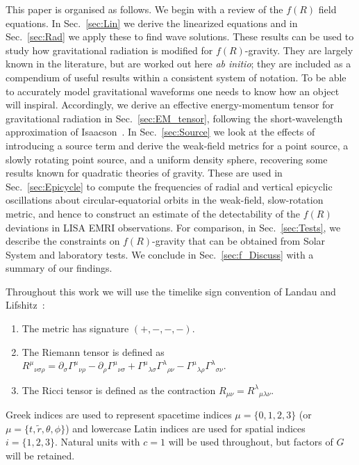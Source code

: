 \documentclass[aps,prd,amsfonts,amssymb,amsmath,nofootinbib,reprint,showpacs]{revtex4-1}
\newcommand{\secref}[1]{Sec.\ \ref{sec:#1}}
\begin{document}
This paper is organised as follows. We begin with a review of the $f(R)$ field equations. In \secref{Lin} we derive the linearized equations and in \secref{Rad} we apply these to find wave solutions. These results can be used to study how gravitational radiation is modified for $f(R)$-gravity. They are largely known in the literature, but are worked out here {\it ab initio}; they are included as a compendium of useful results within a consistent system of notation. To be able to accurately model gravitational waveforms one needs to know how an object will inspiral. Accordingly, we derive an effective energy-momentum tensor for gravitational radiation in \secref{EM_tensor}, following the short-wavelength approximation of Isaacson~\cite{Isaacson1968, Isaacson1968a}. In \secref{Source} we look at the effects of introducing a source term and derive the weak-field metrics for a point source, a slowly rotating point source, and a uniform density sphere, recovering some results known for quadratic theories of gravity. These are used in \secref{Epicycle} to compute the frequencies of radial and vertical epicyclic oscillations about circular-equatorial orbits in the weak-field, slow-rotation metric, and hence to construct an estimate of the detectability of the $f(R)$ deviations in LISA EMRI observations. For comparison, in \secref{Tests}, we describe the constraints on $f(R)$-gravity that can be obtained from Solar System and laboratory tests. We conclude in \secref{f_Discuss} with a summary of our findings.

Throughout this work we will use the timelike sign convention of Landau and Lifshitz~\cite{Landau1975}:
\begin{enumerate}
\item The metric has signature $(+,-,-,-)$.
\item The Riemann tensor is defined as ${R^\mu}_{\nu\sigma\rho} = \partial_\sigma {\Gamma^\mu}_{\nu\rho} - \partial_\rho {\Gamma^\mu}_{\nu\sigma} + {\Gamma^\mu}_{\lambda\sigma}{\Gamma^\lambda}_{\rho\nu} - {\Gamma^\mu}_{\lambda\rho}{\Gamma^\lambda}_{\sigma\nu}$.
\item The Ricci tensor is defined as the contraction $R_{\mu\nu} = {R^\lambda}_{\mu\lambda\nu}$.
\end{enumerate}
Greek indices are used to represent spacetime indices $\mu = \{0,1,2,3\}$ (or $\mu = \{t,\widetilde{r},\theta,\phi\}$) and lowercase Latin indices are used for spatial indices $i = \{1,2,3\}$. Natural units with $c = 1$ will be used throughout, but factors of $G$ will be retained.
\end{document}
